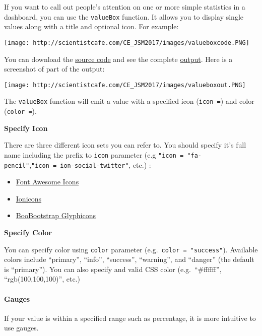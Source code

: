 \documentclass[
]{article}
\providecommand{\tightlist}{%
  \setlength{\itemsep}{0pt}\setlength{\parskip}{0pt}}
\begin{document}
If you want to call out people's attention on one or more simple
statistics in a dashboard, you can use the \texttt{valueBox} function.
It allows you to display single values along with a title and optional
icon. For example:

\texttt{[image: http://scientistcafe.com/CE\_JSM2017/images/valueboxcode.PNG]}

You can download the
\href{http://scientistcafe.com/CE_JSM2017/Examples/valuebox.Rmd}{source
code} and see the complete
\href{http://scientistcafe.com/CE_JSM2017/Examples/valuebox.html}{output}.
Here is a screenshot of part of the output:

\texttt{[image: http://scientistcafe.com/CE\_JSM2017/images/valueboxout.PNG]}

The \texttt{valueBox} function will emit a value with a specified icon
(\texttt{icon\ =}) and color (\texttt{color\ =}).

\textbf{Specify Icon}

There are three different icon sets you can refer to. You should specify
it's full name including the prefix to \texttt{icon} parameter (e.g
\texttt{"icon\ =\ "fa-pencil"},\texttt{"icon\ =\ ion-social-twitter"},
etc.) :

\begin{itemize}
\tightlist
\item
  \href{http://fontawesome.io/icons/}{Font Awesome Icons}
\item
  \href{http://ionicons.com/}{Ionicons}
\item
  \href{https://getbootstrap.com/components/\#glyphicons}{BooBootstrap
  Glyphicons}
\end{itemize}

\textbf{Specify Color}

You can specify color using \texttt{color} parameter
(e.g.~\texttt{color\ =\ "success"}). Available colors include
``primary'', ``info'', ``success'', ``warning'', and ``danger'' (the
default is ``primary''). You can also specify and valid CSS color
(e.g.~``\#ffffff'', ``rgb(100,100,100)'', etc.)

\hypertarget{gauges}{%
\paragraph{Gauges}\label{gauges}}

If your value is within a specified range such as percentage, it is more
intuitive to use gauges.
\end{document}
